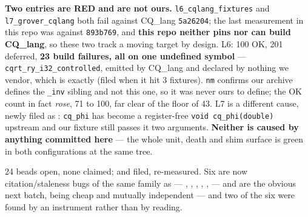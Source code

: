 \medskip
\noindent\textbf{Two entries are RED and are not ours.}
\texttt{l6\_cqlang\_fixtures} and \texttt{l7\_grover\_cqlang} both fail against
CQ\_lang \texttt{5a26204}; the last measurement in this repo was against
\texttt{893b769}, and \textbf{this repo neither pins nor can build CQ\_lang}, so
these two track a moving target by design. L6: 100 OK, 201 deferred,
\textbf{23 build failures, all on one undefined symbol} ---
\texttt{cqrt\_ry\_i32\_controlled}, emitted by CQ\_lang and declared by nothing we
vendor, which is  exactly (filed when it hit 3 fixtures). \texttt{nm}
confirms our archive defines the \texttt{\_inv} sibling and not this one, so it
was never ours to define; the OK count in fact \emph{rose}, 71 to 100, far clear
of the floor of 43. L7 is a different cause, newly filed as :
\texttt{cq\_phi} has become a register-free \texttt{void cq\_phi(double)} upstream
and our fixture still passes it two arguments. \textbf{Neither is caused by
anything committed here} --- the whole unit, death and shim surface is green in
both configurations at the same tree.

24 beads open, none claimed;  and  filed, 
re-measured. Six are now citation/staleness
bugs of the same family as  --- , , ,
, ,  --- and are the obvious next batch, being
cheap and mutually independent --- and two of the six were found by an
instrument rather than by reading.
